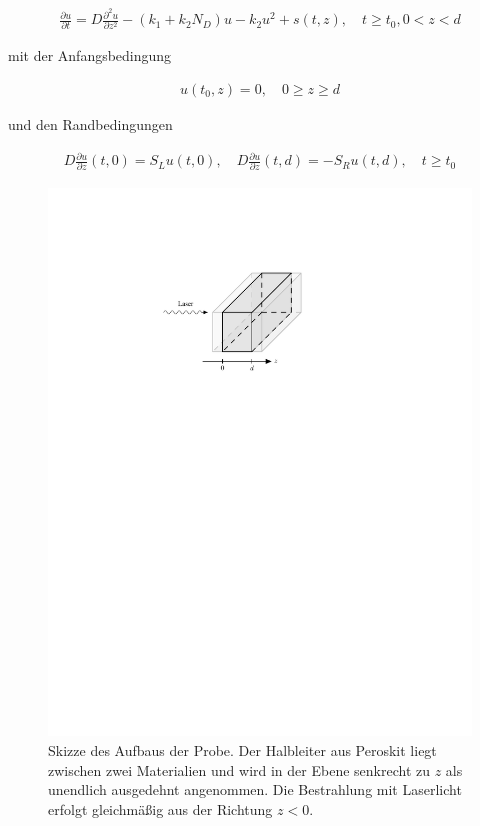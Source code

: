 \documentclass[
	pagesize,
	fontsize=12pt,
	paper=a4,
	oneside,
   reqno
]{scrartcl}
\begin{document}
\begin{align}
   \label{eq:eq1}
   \frac{\partial u}{\partial t} = D\frac{\partial^2 u}{\partial z^2} - (k_1 + k_2N_D)u - k_2u^2 + s(t, z), \quad t \geq t_0, 0 < z < d
\end{align}

mit der Anfangsbedingung

\begin{align}
   \label{eq:eq2}
   u(t_0, z) = 0, \quad 0 \geq z \geq d
\end{align}

und den Randbedingungen

\begin{align}
   \label{eq:eq3}
   D\frac{\partial u}{\partial z}(t, 0) = S_Lu(t, 0), \quad D\frac{\partial u}{\partial z}(t, d) = -S_Ru(t, d), \quad t \geq t_0
\end{align}

\begin{figure}[H]
   \centering
   \includegraphics[scale=0.7]{Bilder/Bild1.pdf}
   \caption[Skizze des Aufbaus der Probe]{Skizze des Aufbaus der Probe. Der Halbleiter aus Peroskit liegt zwischen zwei Materialien und wird in der Ebene senkrecht zu $z$ als unendlich ausgedehnt angenommen. Die Bestrahlung mit Laserlicht erfolgt gleichmäßig aus der Richtung $z < 0$.}
   \label{fig:Bild1}
\end{figure}
\end{document}
